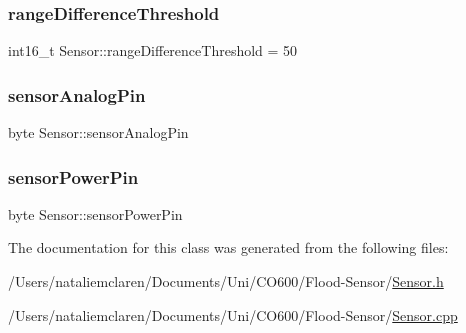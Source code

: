\mbox{\label{class_sensor_aac74d0c04eaadb3ed7f48fc9ad1ea379}} 
\subsubsection{\texorpdfstring{range\+Difference\+Threshold}{rangeDifferenceThreshold}}
{\footnotesize\ttfamily int16\+\_\+t Sensor\+::range\+Difference\+Threshold = 50}

\mbox{\label{class_sensor_a713dcc4e025205c864c44fb23b22ffd8}} 
\subsubsection{\texorpdfstring{sensor\+Analog\+Pin}{sensorAnalogPin}}
{\footnotesize\ttfamily byte Sensor\+::sensor\+Analog\+Pin}

\mbox{\label{class_sensor_a151237329ac720b0edf097ae2bbf873e}} 
\subsubsection{\texorpdfstring{sensor\+Power\+Pin}{sensorPowerPin}}
{\footnotesize\ttfamily byte Sensor\+::sensor\+Power\+Pin}



The documentation for this class was generated from the following files\+:\begin{DoxyCompactItemize}
\item 
/\+Users/nataliemclaren/\+Documents/\+Uni/\+C\+O600/\+Flood-\/\+Sensor/\mbox{\hyperlink{_sensor_8h}{Sensor.\+h}}\item 
/\+Users/nataliemclaren/\+Documents/\+Uni/\+C\+O600/\+Flood-\/\+Sensor/\mbox{\hyperlink{_sensor_8cpp}{Sensor.\+cpp}}\end{DoxyCompactItemize}
